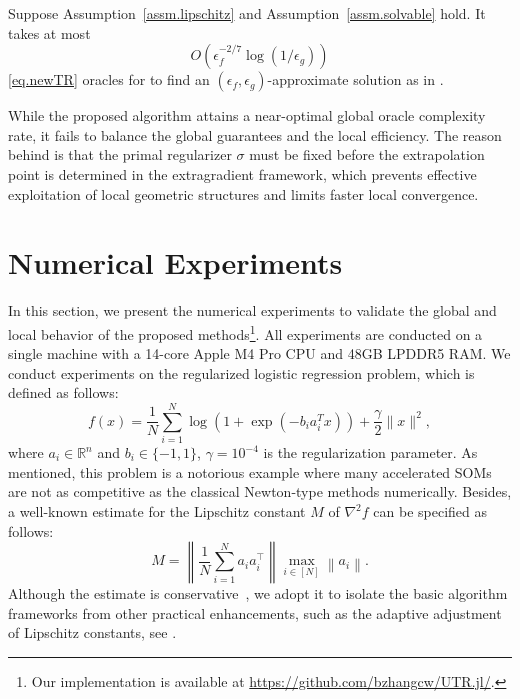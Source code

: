 \documentclass[moor,sglanonrev]{informs4}
\begin{document}
\begin{theorem}
    \label{thm.final complexity of msatr}
    Suppose Assumption~\ref{assm.lipschitz} and Assumption~\ref{assm.solvable} hold. It takes at most
    \begin{equation}
        \label{eq.final complexity of msatr}
        O\left(\epsilon_f^{-2/7}\log\left(1/\epsilon_g\right)\right)
    \end{equation}
    \ref{eq.newTR} oracles for  to find an $(\epsilon_f,\epsilon_g)$-approximate solution as in .
\end{theorem}
While the proposed algorithm attains a near-optimal global oracle complexity rate, it fails to balance the global guarantees and the local efficiency. The reason behind is that the primal regularizer $\sigma$ must be fixed before the extrapolation point is determined in the extragradient framework, which prevents effective exploitation of local geometric structures and limits faster local convergence.
\section{Numerical Experiments}\label{sec.experiments}
In this section, we present the numerical experiments to validate the global and local behavior of the proposed methods\footnote{{\color{red}Our implementation is available at \url{https://github.com/bzhangcw/UTR.jl/}.}}. All experiments are conducted on a single machine with a 14-core Apple M4 Pro CPU and 48GB LPDDR5 RAM.
We conduct experiments on the regularized logistic regression problem, which is defined as follows:
\begin{equation}
    \label{eq.logistic regression}
    f(x) = \frac{1}{N} \sum_{i=1}^N \log (1 + \exp (-b_i a_i^T x)) + \frac{\gamma}{2}\|x\|^2,
\end{equation}
where $a_i \in \mathbb{R}^n$ and $b_i \in \{-1, 1\}$, $\gamma = 10^{-4}$ is the regularization parameter.
As mentioned, this problem is a notorious example where many accelerated SOMs are not as competitive as the classical Newton-type methods \cite{carmon2022optimal,chen2022accelerating} numerically.
Besides, a well-known estimate for the Lipschitz constant $\widehat M$ of $\nabla^2 f$ can be specified as follows:
$$\widehat M = \left\|\frac{1}{N} \sum_{i=1}^N a_i a_i^{\top}\right\| \max _{i \in[N]}\left\|a_i\right\|.$$
Although the estimate is conservative~\cite{song2021unified}, we adopt it to isolate the basic algorithm frameworks from other practical enhancements, such as the adaptive adjustment of Lipschitz constants, see \cite{mishchenko2023regularized,cartis2011adaptive}.
\end{document}
